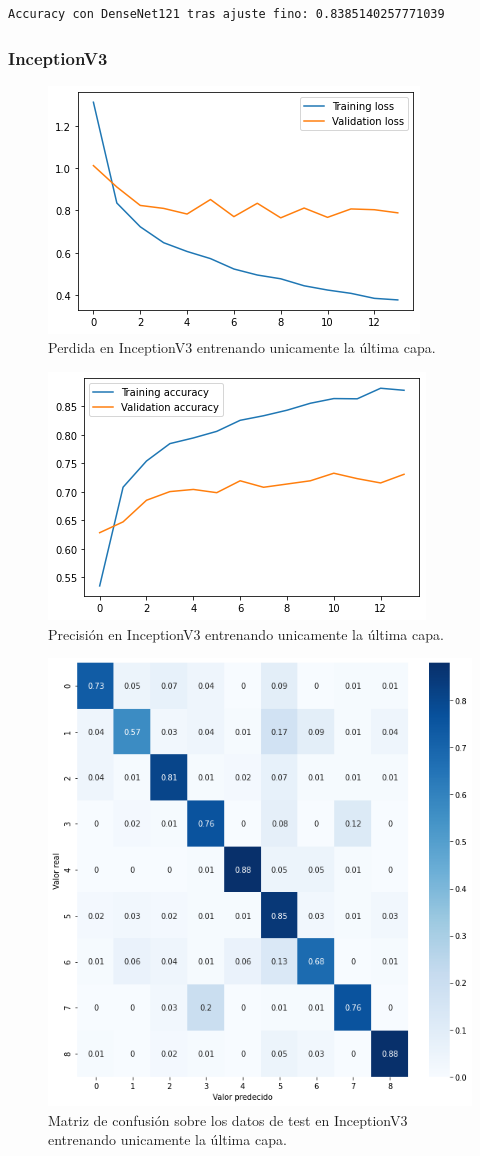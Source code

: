 \begin{lstlisting}
Accuracy con DenseNet121 tras ajuste fino: 0.8385140257771039
\end{lstlisting}



\subsubsection{InceptionV3}

\begin{figure}[H]
  \centering
  \includegraphics[width=0.5\linewidth]{Imagenes/entrenamiento_redes/ult/inception_ult_loss.png}
  \caption{Perdida en InceptionV3 entrenando unicamente la última capa.}
\end{figure}

\begin{figure}[H]
  \centering
  \includegraphics[width=0.5\linewidth]{Imagenes/entrenamiento_redes/ult/inception_ult_acc.png}
  \caption{Precisión en InceptionV3 entrenando unicamente la última capa.}
\end{figure}

\begin{figure}[H]
  \centering
  \includegraphics[width=0.5\linewidth]{Imagenes/entrenamiento_redes/ult/inception_ult_matriz.png}
  \caption{Matriz de confusión sobre los datos de test en InceptionV3 entrenando unicamente la última capa.}
\end{figure}


